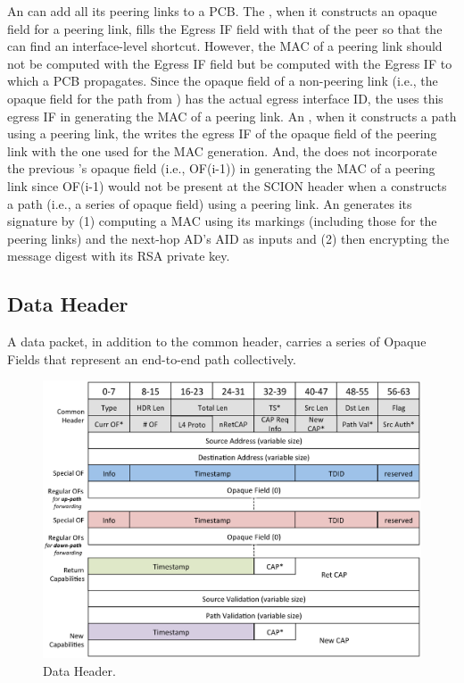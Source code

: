 An \AD can add all its peering links to a PCB. The \BS, when it constructs an opaque field for a peering link, fills the Egress IF field with that of the peer so that the \STUB \AD can find an interface-level shortcut. However, the MAC of a peering link should not be computed with the Egress IF field but be computed with the Egress IF to which a PCB propagates. Since the opaque field of a non-peering link (i.e., the opaque field for the path from \TDC) has the actual egress interface ID, the \BS uses this egress IF in generating the MAC of a peering link. An \STUB \AD, when it constructs a path using a peering link, the \AD writes the egress IF of the opaque field of the peering link with the one used for the MAC generation. And, the \BS does not incorporate the previous \AD's opaque field (i.e., OF(i-1)) in generating the MAC of a peering link since OF(i-1) would not be present at the SCION header when a \STUB \AD constructs a path (i.e., a series of opaque field) using a peering link. An \AD generates its signature by (1) computing a MAC using its markings (including those for the peering links) and the next-hop AD's AID as inputs and (2) then encrypting the message digest with its RSA private key.

\subsection{Data Header}\label{subsec:data-header}
A data packet, in addition to the common header, carries a series of Opaque Fields that represent an end-to-end path collectively.

\begin{figure}[ht]
\centering
\includegraphics[width=.9\columnwidth]{./fig/nhdr_data.eps}
\caption{Data Header.}\label{fig:hdr-data}
\end{figure}

